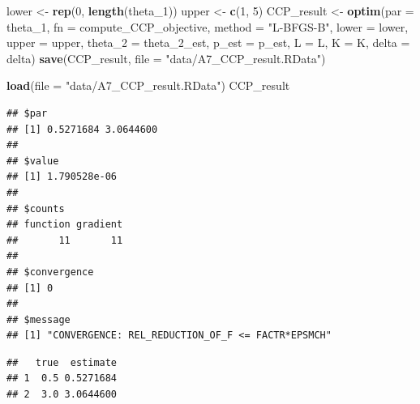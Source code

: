 \documentclass[]{book}
\newenvironment{Shaded}{\begin{snugshade}}{\end{snugshade}}
\newcommand{\KeywordTok}[1]{\textcolor[rgb]{0.13,0.29,0.53}{\textbf{#1}}}
\newcommand{\DataTypeTok}[1]{\textcolor[rgb]{0.13,0.29,0.53}{#1}}
\newcommand{\DecValTok}[1]{\textcolor[rgb]{0.00,0.00,0.81}{#1}}
\newcommand{\StringTok}[1]{\textcolor[rgb]{0.31,0.60,0.02}{#1}}
\newcommand{\OperatorTok}[1]{\textcolor[rgb]{0.81,0.36,0.00}{\textbf{#1}}}
\newcommand{\NormalTok}[1]{#1}
\begin{document}
\begin{Shaded}
\begin{Highlighting}[]
\NormalTok{lower <-}\StringTok{ }\KeywordTok{rep}\NormalTok{(}\DecValTok{0}\NormalTok{, }\KeywordTok{length}\NormalTok{(theta_}\DecValTok{1}\NormalTok{))}
\NormalTok{upper <-}\StringTok{ }\KeywordTok{c}\NormalTok{(}\DecValTok{1}\NormalTok{, }\DecValTok{5}\NormalTok{)}
\NormalTok{CCP_result <-}
\StringTok{  }\KeywordTok{optim}\NormalTok{(}\DataTypeTok{par =}\NormalTok{ theta_}\DecValTok{1}\NormalTok{,}
        \DataTypeTok{fn =}\NormalTok{ compute_CCP_objective,}
        \DataTypeTok{method =} \StringTok{"L-BFGS-B"}\NormalTok{,}
        \DataTypeTok{lower =}\NormalTok{ lower,}
        \DataTypeTok{upper =}\NormalTok{ upper,}
        \DataTypeTok{theta_2 =}\NormalTok{ theta_2_est, }
        \DataTypeTok{p_est =}\NormalTok{ p_est, }
        \DataTypeTok{L =}\NormalTok{ L, }
        \DataTypeTok{K =}\NormalTok{ K, }
        \DataTypeTok{delta =}\NormalTok{ delta)}
\KeywordTok{save}\NormalTok{(CCP_result, }\DataTypeTok{file =} \StringTok{"data/A7_CCP_result.RData"}\NormalTok{)}
\end{Highlighting}
\end{Shaded}

\begin{Shaded}
\begin{Highlighting}[]
\KeywordTok{load}\NormalTok{(}\DataTypeTok{file =} \StringTok{"data/A7_CCP_result.RData"}\NormalTok{)}
\NormalTok{CCP_result}
\end{Highlighting}
\end{Shaded}

\begin{verbatim}
## $par
## [1] 0.5271684 3.0644600
## 
## $value
## [1] 1.790528e-06
## 
## $counts
## function gradient 
##       11       11 
## 
## $convergence
## [1] 0
## 
## $message
## [1] "CONVERGENCE: REL_REDUCTION_OF_F <= FACTR*EPSMCH"
\end{verbatim}

\begin{Shaded}
\end{Shaded}

\begin{verbatim}
##   true  estimate
## 1  0.5 0.5271684
## 2  3.0 3.0644600
\end{verbatim}
\end{document}
